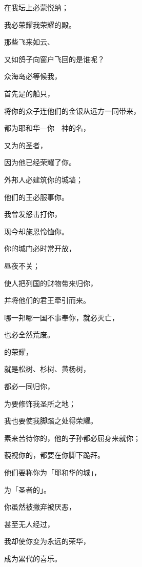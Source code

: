 {\par }{\Q 在我坛上必蒙悦纳；
\par }{\Q 我必荣耀我荣耀的殿。
\par }{\BB \par }{\Q {}那些飞来如云、
\par }{\Q 又如鸽子向窗户飞回的是谁呢？
\par }{\Q {}众海岛必等候我，
\par }{\Q 首先是{}的船只，
\par }{\Q 将你的众子连他们的金银从远方一同带来，
\par }{\Q 都为耶和华—你　神的名，
\par }{\Q 又为{}的圣者，
\par }{\Q 因为他已经荣耀了你。
\par }{\BB \par }{\Q {}外邦人必建筑你的城墙；
\par }{\Q 他们的王必服事你。
\par }{\Q 我曾发怒击打你，
\par }{\Q 现今却施恩怜恤你。
\par }{\Q {}你的城门必时常开放，
\par }{\Q 昼夜不关；
\par }{\Q 使人把列国的财物带来归你，
\par }{\Q 并将他们的君王牵引而来。
\par }{\Q {}哪一邦哪一国不事奉你，就必灭亡，
\par }{\Q 也必全然荒废。
\par }{\Q {}的荣耀，
\par }{\Q 就是松树、杉树、黄杨树，
\par }{\Q 都必一同归你，
\par }{\Q 为要修饰我圣所之地；
\par }{\Q 我也要使我脚踏之处得荣耀。
\par }{\Q {}素来苦待你的，他的子孙都必屈身来就你；
\par }{\Q 藐视你的，都要在你脚下跪拜。
\par }{\Q 他们要称你为「耶和华的城」，
\par }{\Q 为「{}圣者的{}」。
\par }{\BB \par }{\Q {}你虽然被撇弃被厌恶，
\par }{\Q 甚至无人经过，
\par }{\Q 我却使你变为永远的荣华，
\par }{\Q 成为累代的喜乐。
}
